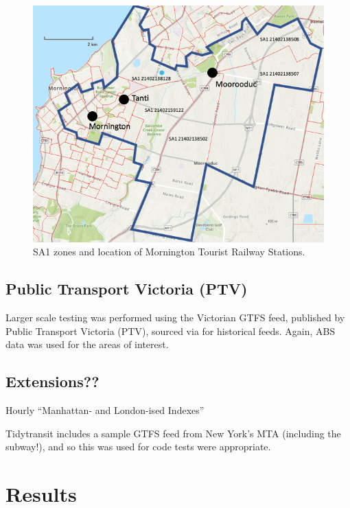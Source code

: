\documentclass[preprint, 3p,
authoryear]{elsarticle} %
\begin{document}
\begin{figure}
\includegraphics[width=8.46in]{graphics/mornington} \caption{SA1 zones and location of Mornington Tourist Railway Stations.}\label{fig:mornington_map_ABS}
\end{figure}

\hypertarget{public-transport-victoria-ptv}{%
\subsection{Public Transport Victoria
(PTV)}\label{public-transport-victoria-ptv}}

Larger scale testing was performed using the Victorian GTFS feed,
published by Public Transport Victoria (PTV), sourced via
\citet{transitfeeds_victoria:2023aa} for historical feeds. Again, ABS
data was used for the areas of interest.

\hypertarget{extensions}{%
\subsection{Extensions??}\label{extensions}}

Hourly ``Manhattan- and London-ised Indexes''

Tidytransit includes a sample GTFS feed from New York's MTA (including
the subway!), and so this was used for code tests were appropriate.

\hypertarget{results}{%
\section{Results}\label{results}}
\end{document}
